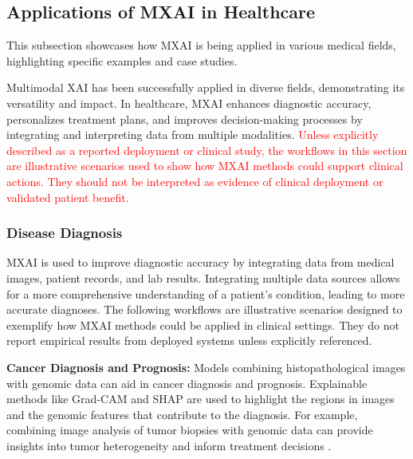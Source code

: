 \documentclass[pdflatex,sn-mathphys-num]{sn-jnl}%
\theoremstyle{thmstyleone}%
\theoremstyle{thmstyletwo}%
\theoremstyle{thmstylethree}%
\begin{document}
\begin{itemize}
\subsection{Applications of MXAI in Healthcare}

This subsection showcases how MXAI is being applied in various medical fields, highlighting specific examples and case studies.

Multimodal XAI has been successfully applied in diverse fields, demonstrating its versatility and impact. In healthcare, MXAI enhances diagnostic accuracy, personalizes treatment plans, and improves decision-making processes by integrating and interpreting data from multiple modalities. \textcolor{red}{Unless explicitly described as a reported deployment or clinical study, the workflows in this section are illustrative scenarios used to show how MXAI methods could support clinical actions. They should not be interpreted as evidence of clinical deployment or validated patient benefit. }

\subsubsection{Disease Diagnosis}

MXAI is used to improve diagnostic accuracy by integrating data from medical images, patient records, and lab results. Integrating multiple data sources allows for a more comprehensive understanding of a patient's condition, leading to more accurate diagnoses.
The following workflows are illustrative scenarios designed to exemplify how MXAI methods could be applied in clinical settings. They do not report empirical results from deployed systems unless explicitly referenced.


     \textbf{Cancer Diagnosis and Prognosis:} Models combining histopathological images with genomic data can aid in cancer diagnosis and prognosis. Explainable methods like Grad-CAM and SHAP are used to highlight the regions in images and the genomic features that contribute to the diagnosis. For example, combining image analysis of tumor biopsies with genomic data can provide insights into tumor heterogeneity and inform treatment decisions \cite{Mohan_2025, wani2024deepxplainer}.


\end{itemize}
\end{document}
